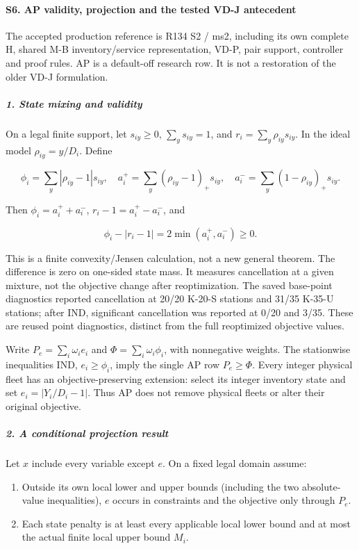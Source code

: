 \documentclass[
  american,
  11pt,
]{article}
\providecommand{\tightlist}{%
  \setlength{\itemsep}{0pt}\setlength{\parskip}{0pt}}
\begin{document}
\paragraph{S6. AP validity, projection and the tested VD-J
antecedent}\label{s6.-ap-validity-projection-and-the-tested-vd-j-antecedent}

The accepted production reference is R134 S2 / ms2, including its own
complete H, shared M-B inventory/service representation, VD-P, pair
support, controller and proof rules. AP is a default-off research row.
It is not a restoration of the older VD-J formulation.

\subparagraph{1. State mixing and
validity}\label{state-mixing-and-validity}

On a legal finite support, let \(s_{iy}\ge0\), \(\sum_y s_{iy}=1\), and
\(r_i=\sum_y\rho_{iy}s_{iy}\). In the ideal model \(\rho_{iy}=y/D_i\).
Define

\[
\phi_i=\sum_y|\rho_{iy}-1|s_{iy},\quad
a_i^+=\sum_y(\rho_{iy}-1)_+s_{iy},\quad
a_i^-=\sum_y(1-\rho_{iy})_+s_{iy}.
\]

Then \(\phi_i=a_i^++a_i^-\), \(r_i-1=a_i^+-a_i^-\), and

\[
\phi_i-|r_i-1|=2\min(a_i^+,a_i^-)\ge0.
\]

This is a finite convexity/Jensen calculation, not a new general
theorem. The difference is zero on one-sided state mass. It measures
cancellation at a given mixture, not the objective change after
reoptimization. The saved base-point diagnostics reported cancellation
at 20/20 K-20-S stations and 31/35 K-35-U stations; after IND,
significant cancellation was reported at 0/20 and 3/35. These are reused
point diagnostics, distinct from the full reoptimized objective values.

Write \(P_e=\sum_i\omega_i e_i\) and \(\Phi=\sum_i\omega_i\phi_i\), with
nonnegative weights. The stationwise inequalities IND, \(e_i\ge\phi_i\),
imply the single AP row \(P_e\ge\Phi\). Every integer physical fleet has
an objective-preserving extension: select its integer inventory state
and set \(e_i=|Y_i/D_i-1|\). Thus AP does not remove physical fleets or
alter their original objective.

\subparagraph{2. A conditional projection
result}\label{a-conditional-projection-result}

Let \(x\) include every variable except \(e\). On a fixed legal domain
assume:

\begin{enumerate}
\def\labelenumi{\arabic{enumi}.}
\tightlist
\item
  Outside its own local lower and upper bounds (including the two
  absolute-value inequalities), \(e\) occurs in constraints and the
  objective only through \(P_e\).
\item
  Each state penalty is at least every applicable local lower bound and
  at most the actual finite local upper bound \(M_i\).
\end{enumerate}
\end{document}
